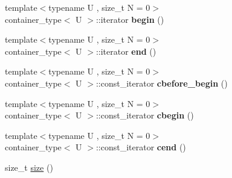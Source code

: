 \begin{DoxyCompactItemize}
\item 
\hypertarget{classheterogeneous_1_1heteroforward__list_3_01_t_00_01_types_8_8_8_4_a9455dc686d0a9752676930e4fd19f642}{}{\footnotesize template$<$typename U , size\+\_\+t N = 0$>$ }\\container\+\_\+type$<$ U $>$\+::iterator {\bfseries begin} ()\label{classheterogeneous_1_1heteroforward__list_3_01_t_00_01_types_8_8_8_4_a9455dc686d0a9752676930e4fd19f642}

\item 
\hypertarget{classheterogeneous_1_1heteroforward__list_3_01_t_00_01_types_8_8_8_4_a52016bea6cdeb8625470d4861eef43a4}{}{\footnotesize template$<$typename U , size\+\_\+t N = 0$>$ }\\container\+\_\+type$<$ U $>$\+::iterator {\bfseries end} ()\label{classheterogeneous_1_1heteroforward__list_3_01_t_00_01_types_8_8_8_4_a52016bea6cdeb8625470d4861eef43a4}

\item 
\hypertarget{classheterogeneous_1_1heteroforward__list_3_01_t_00_01_types_8_8_8_4_aea10451ffc6ebc5988f8c78daf516b80}{}{\footnotesize template$<$typename U , size\+\_\+t N = 0$>$ }\\container\+\_\+type$<$ U $>$\+::const\+\_\+iterator {\bfseries cbefore\+\_\+begin} ()\label{classheterogeneous_1_1heteroforward__list_3_01_t_00_01_types_8_8_8_4_aea10451ffc6ebc5988f8c78daf516b80}

\item 
\hypertarget{classheterogeneous_1_1heteroforward__list_3_01_t_00_01_types_8_8_8_4_a1e66f9ca033110779c46d14ca5f1047e}{}{\footnotesize template$<$typename U , size\+\_\+t N = 0$>$ }\\container\+\_\+type$<$ U $>$\+::const\+\_\+iterator {\bfseries cbegin} ()\label{classheterogeneous_1_1heteroforward__list_3_01_t_00_01_types_8_8_8_4_a1e66f9ca033110779c46d14ca5f1047e}

\item 
\hypertarget{classheterogeneous_1_1heteroforward__list_3_01_t_00_01_types_8_8_8_4_ae0d51ab3e3b9e2ecb71f68d53b3fae65}{}{\footnotesize template$<$typename U , size\+\_\+t N = 0$>$ }\\container\+\_\+type$<$ U $>$\+::const\+\_\+iterator {\bfseries cend} ()\label{classheterogeneous_1_1heteroforward__list_3_01_t_00_01_types_8_8_8_4_ae0d51ab3e3b9e2ecb71f68d53b3fae65}

\item 
\hypertarget{classheterogeneous_1_1heteroforward__list_3_01_t_00_01_types_8_8_8_4_a1b8d887750ab333cf9d987d5753d60b9}{}size\+\_\+t \hyperlink{classheterogeneous_1_1heteroforward__list_3_01_t_00_01_types_8_8_8_4_a1b8d887750ab333cf9d987d5753d60b9}{size} ()\label{classheterogeneous_1_1heteroforward__list_3_01_t_00_01_types_8_8_8_4_a1b8d887750ab333cf9d987d5753d60b9}


\end{DoxyCompactItemize}
